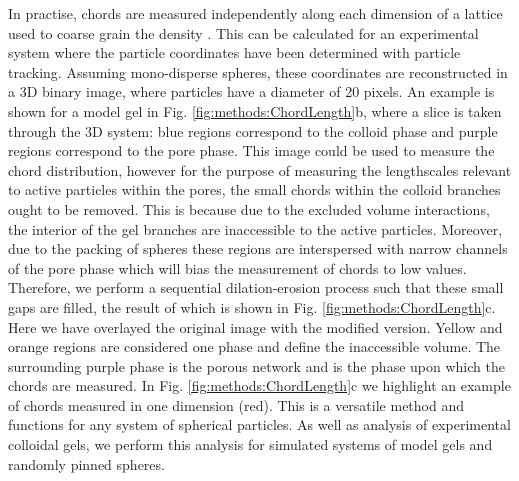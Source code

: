  In practise, chords are measured independently along each dimension of a lattice used to coarse grain the density \cite{testard2011}. This can be calculated for an experimental system where the particle coordinates have been determined with particle tracking. Assuming mono-disperse spheres, these coordinates are reconstructed in a 3D binary image, where particles have a diameter of 20 pixels. An example is shown for a model gel in Fig. \ref{fig:methods:ChordLength}b, where a slice is taken through the 3D system: blue regions correspond to the colloid phase and purple regions correspond to the pore phase. This image could be used to measure the chord distribution, however for the purpose of measuring the lengthscales relevant to active particles within the pores, the small chords within the colloid branches ought to be removed. This is because due to the excluded volume interactions, the interior of the gel branches are inaccessible to the active particles. Moreover, due to the packing of spheres these regions are interspersed with narrow channels of the pore phase which will bias the measurement of chords to low values. Therefore, we perform a sequential dilation-erosion process such that these small gaps are filled, the result of which is shown in Fig. \ref{fig:methods:ChordLength}c. Here we have overlayed the original image with the modified version. Yellow and orange regions are considered one phase and define the inaccessible volume. The surrounding purple phase is the porous network and is the phase upon which the chords are measured. In Fig. \ref{fig:methods:ChordLength}c we highlight an example of chords measured in one dimension (red).
 This is a versatile method and functions for any system of spherical particles. As well as analysis of experimental colloidal gels, we perform this analysis for simulated systems of model gels and randomly pinned spheres. 
 

 
 

%
%
%


